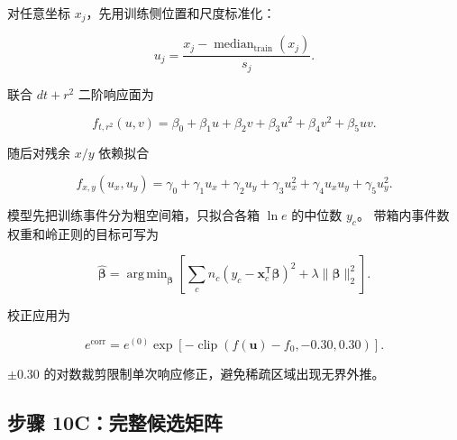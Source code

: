 \documentclass[UTF8,12pt,a4paper,oneside,fontset=none]{ctexart}
\numberwithin{equation}{section}
\DeclareMathOperator{\median}{median}
\DeclareMathOperator*{\argminop}{arg\,min}
\begin{document}
对任意坐标 \(x_j\)，先用训练侧位置和尺度标准化：

\begin{equation}
u_j
=
\frac{x_j-\median_{\mathrm{train}}(x_j)}{s_j}.
\label{eq:standard-coordinate}
\end{equation}

联合 \(dt+r^2\) 二阶响应面为

\begin{equation}
f_{t,r^2}(u,v)
=
\beta_0+\beta_1u+\beta_2v
+\beta_3u^2+\beta_4v^2+\beta_5uv.
\label{eq:dt-r2-surface}
\end{equation}

随后对残余 \(x/y\) 依赖拟合

\begin{equation}
f_{x,y}(u_x,u_y)
=
\gamma_0+\gamma_1u_x+\gamma_2u_y
+\gamma_3u_x^2+\gamma_4u_xu_y+\gamma_5u_y^2.
\label{eq:xy-surface}
\end{equation}

模型先把训练事件分为粗空间箱，只拟合各箱 \(\ln e\) 的中位数 \(y_c\)。
带箱内事件数权重和岭正则的目标可写为

\begin{equation}
\widehat{\symbf{\beta}}
=
\argminop_{\symbf{\beta}}
\left[
\sum_c n_c\left(y_c-\symbf{x}_c^{\mathsf T}\symbf{\beta}\right)^2
+\lambda\lVert\symbf{\beta}\rVert_2^2
\right].
\label{eq:cell-fit}
\end{equation}

校正应用为

\begin{equation}
e^{\mathrm{corr}}
=
e^{(0)}
\exp\left[
-\operatorname{clip}
\left(f(\symbf{u})-f_0,-0.30,0.30\right)
\right].
\label{eq:surface-correction}
\end{equation}

\(\pm0.30\) 的对数裁剪限制单次响应修正，避免稀疏区域出现无界外推。

\subsection{步骤 10C：完整候选矩阵}
\end{document}
